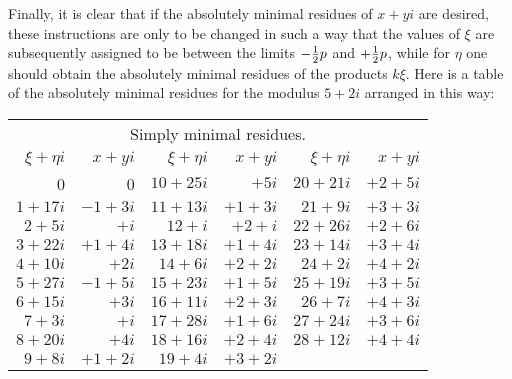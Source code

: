 \documentclass[twoside,12pt]{memoir}
\let\oldfrac\frac
\def\frac#1#2{\mathchoice{\tfrac{#1}{#2}}{\oldfrac{#1}{#2}}{\genfrac{}{}{}{2}{#1}{#2\mathstrut}}{\genfrac{}{}{}{3}{#1}{#2\mathstrut}}}
\begin{document}
Finally, it is clear that if the absolutely minimal residues of \(x+yi\) are desired, these instructions are only to be changed in such a way that the values of \(\xi\) are subsequently assigned to be between the limits \(-\frac{1}{2} p\) and \(+\frac{1}{2} p\), while for \(\eta\) one should obtain the absolutely minimal residues of the products \(k\xi\). Here is a table of the absolutely minimal residues for the modulus \(5+2i\) arranged in this way:
\begin{center}
\begin{tabular}{r|r||r|r||r|r}
\multicolumn{6}{c}{Simply minimal residues.}\\
\(\xi+\eta i\) & \(x+yi\) & \(\xi+\eta i\) & \(x+yi\) & \(\xi+\eta i\) & \(x+yi\) \\
\hline
0 & 0 & \(10+25i\) & \(+5i\) & \(20+21i\) & \(+2+5i\) \\
\(1+17i\) & \(-1+3i\) & \(11+13i\) & \(+1+3i\) & \(21+9i\) & \(+3+3i\) \\
\(2+5i\) & \(+i\) & \(12+i\) & \(+2+i\) & \(22+26i\) & \(+2+6i\) \\
\(3+22i\) & \(+1+4i\) & \(13+18i\) & \(+1+4i\) & \(23+14i\) & \(+3+4i\) \\
\(4+10i\) & \(+2i\) & \(14+6i\) & \(+2+2i\) & \(24+2i\) & \(+4+2i\) \\
\(5+27i\) & \(-1+5i\) & \(15+23i\) & \(+1+5i\) & \(25+19i\) & \(+3+5i\) \\
\(6+15i\) & \(+3i\) & \(16+11i\) & \(+2+3i\) & \(26+7i\) & \(+4+3i\) \\
\(7+3i\) & \(+i\) & \(17+28i\) & \(+1+6i\) & \(27+24i\) & \(+3+6i\) \\
\(8+20i\) & \(+4i\) & \(18+16i\) & \(+2+4i\) & \(28+12i\) & \(+4+4i\) \\
\(9+8i\) & \(+1+2i\) & \(19+4i\) & \(+3+2i\) &\multicolumn{2}{c}{} \\
\end{tabular}\pagebreak%


\end{center}
\end{document}
